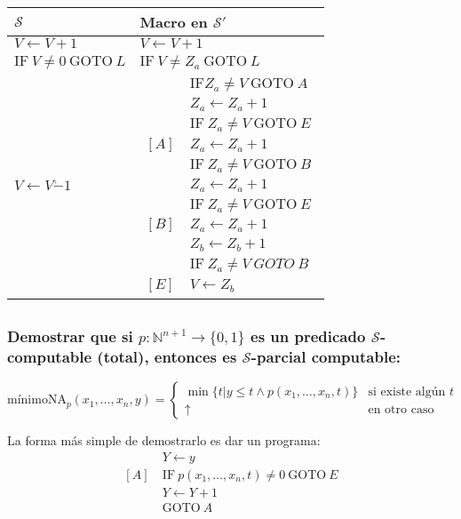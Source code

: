 \documentclass[fleqn, 11pt]{article}
\newcommand{\nat}{\mathbb{N}}
\newcommand{\Scur}{\mathcal{S}}
\newcommand{\indef}{\uparrow}
\newcommand{\into}{\leftarrow}
\newcommand{\IF}{\text{IF}}
\newcommand{\GOTO}{\text{GOTO}}
\begin{document}
\begin{tabular}{l l}
	$\Scur$                     & Macro en $\Scur'$ \\ \toprule
	$V \into V + 1$             & $V \into V + 1$ \\
	$\IF\ V \neq 0\ \GOTO\ L$ & $\IF\ V \neq Z_a\ \GOTO\ L$ \\
	$V \into V \dot- 1$         &
	$\begin{aligned}
		     &\IF Z_a \neq V\ \GOTO\ A \\
		     &Z_a \into Z_a + 1 \\
		     &\IF\ Z_a \neq V\ \GOTO\ E \\
		[A]\ &Z_a \into Z_a + 1 \\
		     &\IF\ Z_a \neq V\ \GOTO\ B \\
		     &Z_a \into Z_a + 1 \\
		     &\IF\ Z_a \neq V\ \GOTO\ E \\
		[B]\ &Z_a \into Z_a + 1 \\
		     &Z_b \into Z_b + 1 \\
		     &\IF\ Z_a \neq V\ GOTO\ B \\
		[E]\ &V \into Z_b
	\end{aligned}$
\end{tabular}

\subsection{}

\subsubsection{Demostrar que si $p : \nat^{n+1} \to \{0, 1\}$ es un predicado
$\Scur$-computable (total), entonces es $\Scur$-parcial computable:}
\[
	\text{mínimoNA}_p(x_1, \dots, x_n, y) =
	\begin{cases}
		\min \{t | y \leq t \land p(x_1, \dots, x_n, t)\}
			& \text{si existe algún } t \\
		\indef & \text{en otro caso}
	\end{cases}
\]

La forma más simple de demostrarlo es dar un programa:
\begin{align*}
	     &Y \into y \\
	[A]\ &\IF\ p(x_1, \dots, x_n, t) \neq 0\ \GOTO\ E \\
	     &Y \into Y + 1 \\
	     &\GOTO\ A
\end{align*}
\end{document}
